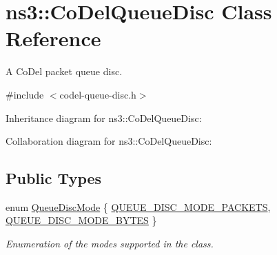 \hypertarget{classns3_1_1CoDelQueueDisc}{}\section{ns3\+:\+:Co\+Del\+Queue\+Disc Class Reference}
\label{classns3_1_1CoDelQueueDisc}


A Co\+Del packet queue disc.  




{\ttfamily \#include $<$codel-\/queue-\/disc.\+h$>$}



Inheritance diagram for ns3\+:\+:Co\+Del\+Queue\+Disc\+:


Collaboration diagram for ns3\+:\+:Co\+Del\+Queue\+Disc\+:
\subsection*{Public Types}
\begin{DoxyCompactItemize}
\item 
enum \hyperlink{classns3_1_1CoDelQueueDisc_a6149d83cd9f193b54b55efa7309b79eb}{Queue\+Disc\+Mode} \{ \hyperlink{classns3_1_1CoDelQueueDisc_a6149d83cd9f193b54b55efa7309b79eba373e8cb28bf34e16cf0b9b1ed5aee5a0}{Q\+U\+E\+U\+E\+\_\+\+D\+I\+S\+C\+\_\+\+M\+O\+D\+E\+\_\+\+P\+A\+C\+K\+E\+TS}, 
\hyperlink{classns3_1_1CoDelQueueDisc_a6149d83cd9f193b54b55efa7309b79ebaaae7bcc283fc6f666eb26c7d479d591a}{Q\+U\+E\+U\+E\+\_\+\+D\+I\+S\+C\+\_\+\+M\+O\+D\+E\+\_\+\+B\+Y\+T\+ES}
 \}\begin{DoxyCompactList}\small\item\em Enumeration of the modes supported in the class. \end{DoxyCompactList}
\end{DoxyCompactItemize}
